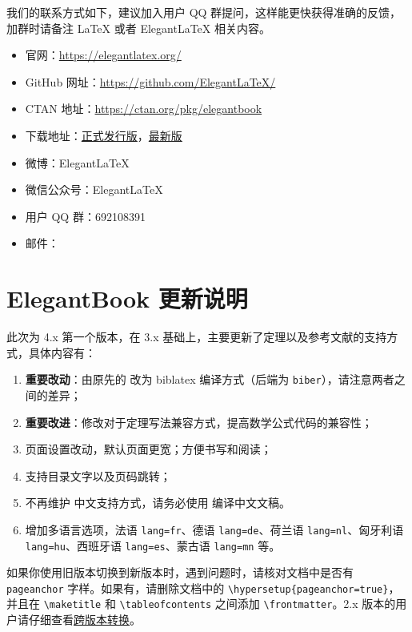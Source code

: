 \documentclass[cn,10pt,math=newtx,citestyle=gb7714-2015,bibstyle=gb7714-2015]{elegantbook}
\begin{document}
我们的联系方式如下，建议加入用户 QQ 群提问，这样能更快获得准确的反馈，加群时请备注 \LaTeX{} 或者 Elegant\LaTeX{} 相关内容。
\begin{itemize}
  \item 官网：\href{https://elegantlatex.org/}{https://elegantlatex.org/}
  \item GitHub 网址：\href{https://github.com/ElegantLaTeX/}{https://github.com/ElegantLaTeX/}
  \item CTAN 地址：\href{https://ctan.org/pkg/elegantbook}{https://ctan.org/pkg/elegantbook}
  \item 下载地址：\href{https://github.com/ElegantLaTeX/ElegantBook/releases}{正式发行版}，\href{https://github.com/ElegantLaTeX/ElegantBook/archive/master.zip}{最新版}
  \item 微博：Elegant\LaTeX{}
  \item 微信公众号：Elegant\LaTeX{}
  \item 用户 QQ 群：692108391 
  \item 邮件：
\end{itemize}


\section{ElegantBook 更新说明}

此次为 4.x 第一个版本，在 3.x 基础上，主要更新了定理以及参考文献的支持方式，具体内容有：

\begin{enumerate}
  \item \textbf{重要改动}：由原先的  改为 biblatex 编译方式（后端为 \lstinline{biber}），请注意两者之间的差异；
  \item \textbf{重要改进}：修改对于定理写法兼容方式，提高数学公式代码的兼容性；
  \item 页面设置改动，默认页面更宽；方便书写和阅读；
  \item 支持目录文字以及页码跳转；
  \item 不再维护  中文支持方式，请务必使用  编译中文文稿。
  \item 增加多语言选项，法语 \lstinline{lang=fr}、德语 \lstinline{lang=de}、荷兰语 \lstinline{lang=nl}、匈牙利语 \lstinline{lang=hu}、西班牙语 \lstinline{lang=es}、蒙古语 \lstinline{lang=mn} 等。
\end{enumerate}

\begin{note}
如果你使用旧版本切换到新版本时，遇到问题时，请核对文档中是否有 \lstinline{pageanchor} 字样。如果有，请删除文档中的 \lstinline|\hypersetup{pageanchor=true}|，并且在 \lstinline{\maketitle} 和 \lstinline{\tableofcontents} 之间添加 \lstinline{\frontmatter}。2.x 版本的用户请仔细查看\href{https://github.com/ElegantLaTeX/ElegantBook/wiki/convert}{跨版本转换}。
\end{note}
\end{document}
